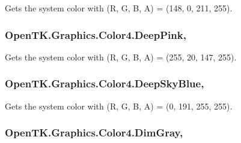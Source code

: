 Gets the system color with (R, G, B, A) = (148, 0, 211, 255). 

\hypertarget{struct_open_t_k_1_1_graphics_1_1_color4_a4d44a932f5fcdcc9912a70656123a470}{
\subsubsection[{Deep\-Pink}]{ Open\-T\-K.\-Graphics.\-Color4.\-Deep\-Pink\hspace{0.3cm}{\ttfamily [static]}, {\ttfamily [get]}}}\label{struct_open_t_k_1_1_graphics_1_1_color4_a4d44a932f5fcdcc9912a70656123a470}


Gets the system color with (R, G, B, A) = (255, 20, 147, 255). 

\hypertarget{struct_open_t_k_1_1_graphics_1_1_color4_a4b81999d278d3eed290ef9a4675261c4}{
\subsubsection[{Deep\-Sky\-Blue}]{ Open\-T\-K.\-Graphics.\-Color4.\-Deep\-Sky\-Blue\hspace{0.3cm}{\ttfamily [static]}, {\ttfamily [get]}}}\label{struct_open_t_k_1_1_graphics_1_1_color4_a4b81999d278d3eed290ef9a4675261c4}


Gets the system color with (R, G, B, A) = (0, 191, 255, 255). 

\hypertarget{struct_open_t_k_1_1_graphics_1_1_color4_ac552cb0ae33bd3b1e4cbc0412f840754}{
\subsubsection[{Dim\-Gray}]{ Open\-T\-K.\-Graphics.\-Color4.\-Dim\-Gray\hspace{0.3cm}{\ttfamily [static]}, {\ttfamily [get]}}}\label{struct_open_t_k_1_1_graphics_1_1_color4_ac552cb0ae33bd3b1e4cbc0412f840754}


